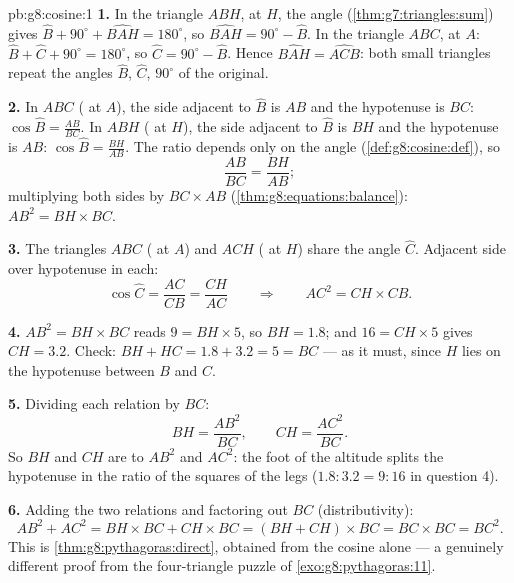 \begin{solution}{pb:g8:cosine:1}
\textbf{1.} In the triangle $ABH$,  at $H$, the angle
 (\cref{thm:g7:triangles:sum}) gives
$\widehat B + 90^\circ + \widehat{BAH} = 180^\circ$, so
$\widehat{BAH} = 90^\circ - \widehat B$. In the triangle $ABC$,
 at $A$:
$\widehat B + \widehat C + 90^\circ = 180^\circ$, so
$\widehat C = 90^\circ - \widehat B$. Hence
$\widehat{BAH} = \widehat{ACB}$: both small triangles repeat the
angles $\widehat B$, $\widehat C$, $90^\circ$ of the original.

\textbf{2.} In $ABC$ ( at $A$), the side adjacent to
$\widehat B$ is $AB$ and the hypotenuse is $BC$:
$\cos\widehat B = \frac{AB}{BC}$. In $ABH$ ( at $H$),
the side adjacent to $\widehat B$ is $BH$ and the hypotenuse is
$AB$: $\cos\widehat B = \frac{BH}{AB}$. The ratio depends only on
the angle (\cref{def:g8:cosine:def}), so
\[
\frac{AB}{BC} = \frac{BH}{AB} ;
\]
multiplying both sides by $BC \times AB$
(\cref{thm:g8:equations:balance}):
$AB^2 = BH \times BC$.

\textbf{3.} The triangles $ABC$ ( at $A$) and $ACH$
( at $H$) share the angle $\widehat C$. Adjacent side
over hypotenuse in each:
\[
\cos\widehat C = \frac{AC}{CB} = \frac{CH}{AC}
\qquad\Longrightarrow\qquad
AC^2 = CH \times CB .
\]

\textbf{4.} $AB^2 = BH \times BC$ reads $9 = BH \times 5$, so
$BH = 1.8$; and $16 = CH \times 5$ gives $CH = 3.2$. Check:
$BH + HC = 1.8 + 3.2 = 5 = BC$ --- as it must, since $H$ lies on
the hypotenuse between $B$ and $C$.

\textbf{5.} Dividing each relation by $BC$:
\[
BH = \frac{AB^2}{BC},
\qquad
CH = \frac{AC^2}{BC} .
\]
So $BH$ and $CH$ are  to $AB^2$ and $AC^2$: the foot
of the altitude splits the hypotenuse in the ratio of the squares
of the legs ($1.8 : 3.2 = 9 : 16$ in question 4).

\textbf{6.} Adding the two relations and factoring out $BC$
(distributivity):
\[
AB^2 + AC^2 = BH \times BC + CH \times BC
= (BH + CH) \times BC = BC \times BC = BC^2 .
\]
This is \cref{thm:g8:pythagoras:direct}, obtained from the cosine
alone --- a genuinely different proof from the four-triangle 
puzzle of \cref{exo:g8:pythagoras:11}.


\end{solution}
